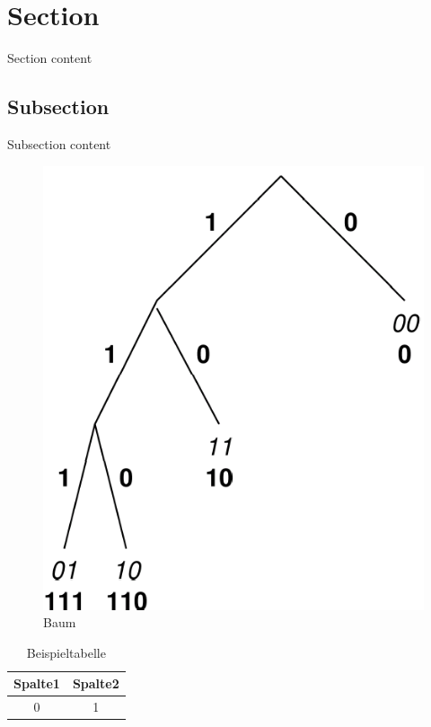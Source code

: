 
\section{Section}

Section content

\subsection{Subsection}

Subsection content \cite{ietf-ipfix-protocol,snoeren2001hash,belenky2003ip}

\begin{figure}[h]%
 	\begin{center}%
 		\includegraphics[scale=0.1]{figure1.png}%
 		\caption{Baum}\label{fig:baum}%
 	\end{center}%
\end{figure}

\begin{table}[h]%
 	\begin{center}%
		\caption{Beispieltabelle}\label{tab:example}%
	 	\begin{tabular}{c|c}%
 			Spalte1 & Spalte2\\
 			\hline
 			0 & 1\\
 		\end{tabular}%
 	\end{center}%
\end{table}
